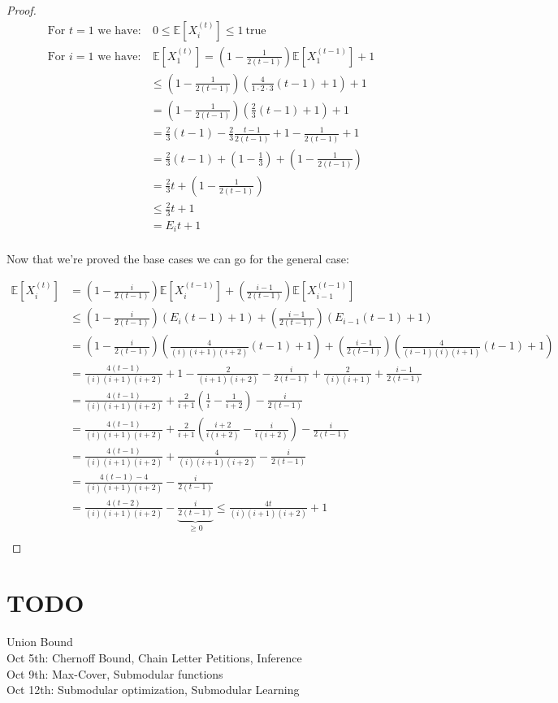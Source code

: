 \documentclass[]{article}
\begin{document}
\begin{proof}
\begingroup
\addtolength{\jot}{1em}
\begin{align*}
\text{For }t = 1 \text{ we have:}&\ 0\leq \mathbb{E}\left[X_i^{(t)} \right] \leq 1\ \text{true}\\
\text{For }i = 1 \text{ we have:}&\ \mathbb{E}\left[X_1^{(t)} \right] =  \left( 1 - \frac{1}{2(t-1)}\right)\mathbb{E}\left[X_1^{(t-1)} \right] + 1\\
&\leq \left( 1 - \frac{1}{2(t-1)}\right)\left(\frac{4}{1\cdot2\cdot3}(t-1)+1\right) + 1\\
&= \left( 1 - \frac{1}{2(t-1)}\right)\left(\frac{2}{3}(t-1)+1\right) + 1\\
&= \frac{2}{3}(t-1) - \frac{2}{3}\frac{t-1}{2(t-1)} + 1 - \frac{1}{2(t-1)} + 1\\
&= \frac{2}{3}(t-1) + \left(1- \frac{1}{3}\right) + \left(1 - \frac{1}{2(t-1)}\right)\\
&= \frac{2}{3}t + \left(1 - \frac{1}{2(t-1)}\right)\\
&\leq \frac{2}{3}t  + 1\\
&= E_i t + 1\\
\end{align*}
\endgroup

Now that we're proved the base cases we can go for the general case:

\begingroup
\addtolength{\jot}{1em}
\begin{align*}
\mathbb{E}\left[X_i^{(t)} \right] &=  \left( 1 - \frac{i}{2(t-1)}\right)\mathbb{E}\left[X_i^{(t-1)} \right] + \left(\frac{i-1}{2(t-1)}\right)\mathbb{E}\left[X_{i-1}^{(t-1)} \right]\\
&\leq \left( 1 - \frac{i}{2(t-1)}\right)\left(E_i (t-1) + 1\right) + \left(\frac{i-1}{2(t-1)}\right)\left(E_{i-1} (t-1) + 1\right)\\
&= \left( 1 - \frac{i}{2(t-1)}\right)\left(\frac{4}{(i)(i+1)(i+2)} (t-1) + 1\right) + \left(\frac{i-1}{2(t-1)}\right)\left(\frac{4}{(i-1)(i)(i+1)} (t-1) + 1\right)\\ 
&= \frac{4(t-1)}{(i)(i+1)(i+2)} + 1 - \frac{2}{(i+1)(i+2)} - \frac{i}{2(t-1)} + \frac{2}{(i)(i+1)} + \frac{i-1}{2(t-1)}\\
&= \frac{4(t-1)}{(i)(i+1)(i+2)} + \frac{2}{i+1}\left(\frac{1}{i} - \frac{1}{i+2}\right) - \frac{i}{2(t-1)} \\
&= \frac{4(t-1)}{(i)(i+1)(i+2)} + \frac{2}{i+1}\left(\frac{i+2}{i(i+2)} - \frac{i}{i(i+2)}\right) - \frac{i}{2(t-1)}\\
&= \frac{4(t-1)}{(i)(i+1)(i+2)} + \frac{4}{(i)(i+1)(i+2)} - \frac{i}{2(t-1)}\\
&= \frac{4(t-1) - 4}{(i)(i+1)(i+2)} - \frac{i}{2(t-1)}\\
&= \frac{4(t-2)}{(i)(i+1)(i+2)} - \underbrace{\frac{i}{2(t-1)}}_{\geq 0} \leq \frac{4t}{(i)(i+1)(i+2)} + 1\\
\end{align*}
\endgroup
\end{proof}

\section{TODO}

Union Bound\\
Oct 5th: Chernoff Bound, Chain Letter Petitions, Inference\\
Oct 9th: Max-Cover, Submodular functions\\
Oct 12th: Submodular optimization, Submodular Learning\\
\end{document}
